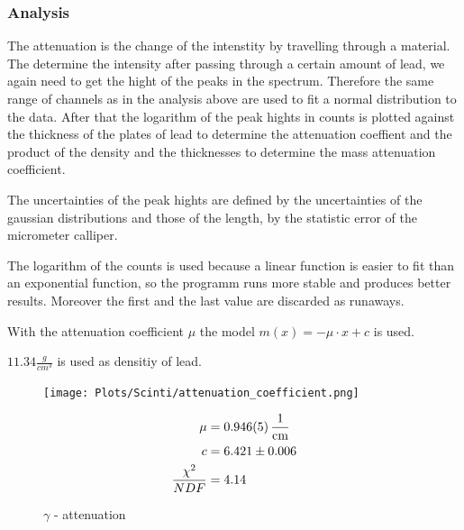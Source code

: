 \documentclass[12pt,twoside,a4paper]{scrartcl}
\begin{document}
		\subsubsection{Analysis}
        The attenuation is the change of the intenstity by travelling through a material.
        The determine the intensity after passing through a certain amount of lead, we again need to
        get the hight of the peaks in the spectrum. Therefore the same range of channels
        as in the analysis above are used to fit a normal distribution to the data.
        After that the logarithm of the peak hights in counts is plotted against the thickness of
        the plates of lead to determine the attenuation coeffient and the product of
        the density and the thicknesses to determine the mass attenuation coefficient.

        The uncertainties of the peak hights are defined by the uncertainties of
        the gaussian distributions and those of the length, by the statistic error of the
        micrometer calliper.

        The logarithm of the counts is used because a linear function is easier to
        fit than an exponential function, so the programm runs more stable and
        produces better results. Moreover the first and the last value are discarded as runaways.

        With the attenuation coefficient $\mu$ the model $m(x) = -\mu \cdot x + c$
        is used.

        $11.34\frac{g}{cm^3}$ is used as densitiy of lead.

        \begin{figure}[H]
					\centering
                \begin{minipage}{0.69 \textwidth}
                    \texttt{[image: Plots/Scinti/attenuation\_coefficient.png]}
                \end{minipage}
                \begin{minipage}{0.29 \textwidth}
                    \begin{align*}
                        	\mu&= \SI{0.946 \pm 0.005}{\frac{1}{\centi\metre}} \\
                        	c &= 6.421 \pm 0.006 \\
                        	\frac{\chi^2}{NDF} &= 4.14
                    \end{align*}
                \end{minipage}
                \caption{$\gamma$ - attenuation}
            \end{figure}
\end{document}
